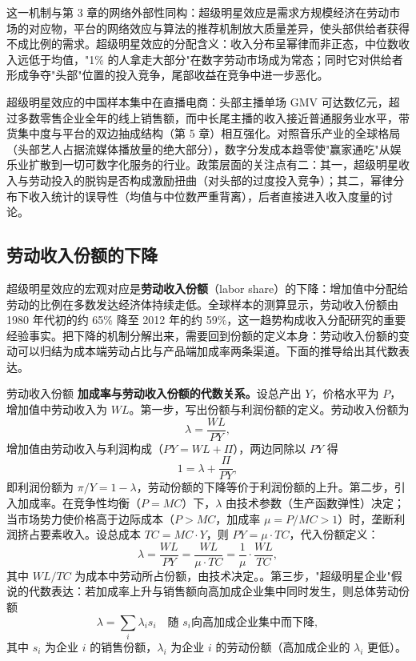 这一机制与第 3 章的网络外部性同构：超级明星效应是需求方规模经济在劳动市场的对应物，平台的网络效应与算法的推荐机制放大质量差异，使头部供给者获得不成比例的需求。超级明星效应的分配含义：收入分布呈幂律而非正态，中位数收入远低于均值，"1\% 的人拿走大部分"在数字劳动市场成为常态；同时它对供给者形成争夺"头部"位置的投入竞争，尾部收益在竞争中进一步恶化。

超级明星效应的中国样本集中在直播电商：头部主播单场 GMV 可达数亿元，超过多数零售企业全年的线上销售额，而中长尾主播的收入接近普通服务业水平，带货集中度与平台的双边抽成结构（第 5 章）相互强化。对照音乐产业的全球格局（头部艺人占据流媒体播放量的绝大部分），数字分发成本趋零使"赢家通吃"从娱乐业扩散到一切可数字化服务的行业。政策层面的关注点有二：其一，超级明星收入与劳动投入的脱钩是否构成激励扭曲（对头部的过度投入竞争）；其二，幂律分布下收入统计的误导性（均值与中位数严重背离），后者直接进入收入度量的讨论。

\subsection{劳动收入份额的下降}

超级明星效应的宏观对应是\textbf{劳动收入份额}（labor share）的下降：增加值中分配给劳动的比例在多数发达经济体持续走低。全球样本的测算显示，劳动收入份额由 1980 年代初的约 65\% 降至 2012 年的约 59\%，这一趋势构成收入分配研究的重要经验事实。把下降的机制分解出来，需要回到份额的定义本身：劳动收入份额的变动可以归结为成本端劳动占比与产品端加成率两条渠道。下面的推导给出其代数表达。

\begin{derivation}{劳动收入份额}{}
\textbf{加成率与劳动收入份额的代数关系。}设总产出 $Y$，价格水平为 $P$，增加值中劳动收入为 $WL$。第一步，写出份额与利润份额的定义。劳动收入份额为
\[
\lambda = \frac{WL}{PY},
\]
增加值由劳动收入与利润构成（$PY = WL + \Pi$），两边同除以 $PY$ 得
\[
1 = \lambda + \frac{\Pi}{PY},
\]
即利润份额为 $\pi/Y = 1 - \lambda$，劳动份额的下降等价于利润份额的上升。第二步，引入加成率。在竞争性均衡（$P = MC$）下，$\lambda$ 由技术参数（生产函数弹性）决定；当市场势力使价格高于边际成本（$P > MC$，加成率 $\mu = P/MC > 1$）时，垄断利润挤占要素收入。设总成本 $TC = MC \cdot Y$，则 $PY = \mu \cdot TC$，代入份额定义：
\[
\lambda = \frac{WL}{PY} = \frac{WL}{\mu \cdot TC} = \frac{1}{\mu} \cdot \frac{WL}{TC},
\]
其中 $WL/TC$ 为成本中劳动所占份额，由技术决定。。第三步，"超级明星企业"假说的代数表达：若加成率上升与销售额向高加成企业集中同时发生，则总体劳动份额
\[
\lambda = \sum_i \lambda_i s_i \quad \text{随 } s_i \text{向高加成企业集中而下降},
\]
其中 $s_i$ 为企业 $i$ 的销售份额，$\lambda_i$ 为企业 $i$ 的劳动份额（高加成企业的 $\lambda_i$ 更低）。
\end{derivation}

